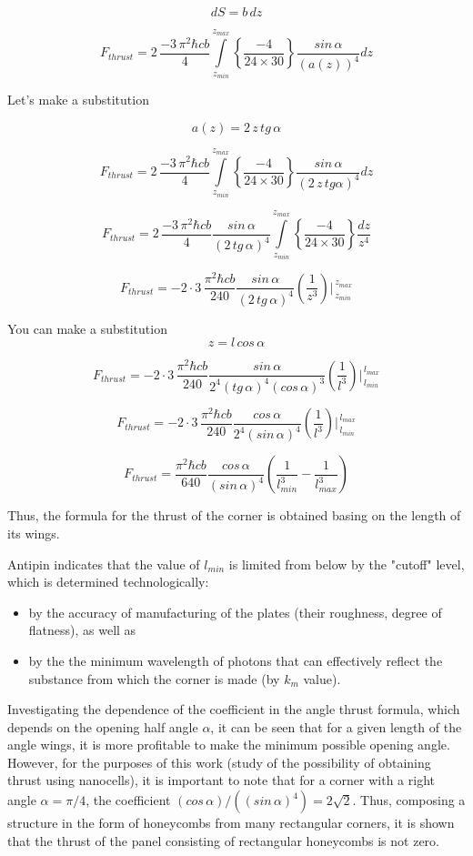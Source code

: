\documentclass[11pt]{article}
\begin{document}
\[dS = b\,dz\]

\[F_{thrust} = 2\, \frac{-3\,\pi^2\hbar c b}{4}\int\limits_{z_{min}}^{z_{max}} \left\{\frac{-4}{24\times30}\right\}\frac{sin\, \alpha}{\left(a\left(z\right)\right)^4}dz\]

Let's make a substitution

\[a\left(z\right) = 2\,z\,tg\, \alpha\]

\[F_{thrust} = 2\, \frac{-3\,\pi^2\hbar c b}{4}\int\limits_{z_{min}}^{z_{max}} \left\{\frac{-4}{24\times30}\right\}\frac{sin\, \alpha}{\left(2\,z\,tg \alpha\right)^4}dz\]

\[F_{thrust} = 2\, \frac{-3\,\pi^2\hbar c b}{4} \frac{sin\, \alpha}{\left(2\,tg\, \alpha\right)^4} \int\limits_{z_{min}}^{z_{max}} \left\{\frac{-4}{24\times30}\right\} \frac{dz}{z^4}\]

\[F_{thrust} = -2\cdot3\, \frac{\pi^2\hbar c b}{240} \frac{sin\, \alpha}{\left(2\,tg\, \alpha\right)^4} \left(\frac{1}{z^3}\right)\Bigg\rvert_{\,z_{min}}^{\,z_{max}} \]

    You can make a substitution \[z = l\, cos\, \alpha\]

\[F_{thrust} = -2\cdot3\, \frac{\pi^2\hbar c b}{240} \frac{sin\, \alpha}{2^4\left(tg\,\alpha\right)^4\left(cos\, \alpha\right)^3} \left(\frac{1}{l^3}\right)\Bigg\rvert_{\,l_{min}}^{\,l_{max}} \]

\[F_{thrust} = -2\cdot3\, \frac{\pi^2\hbar c b}{240} \frac{cos\, \alpha}{2^4\left(sin\, \alpha\right)^4} \left(\frac{1}{l^3}\right)\Bigg\rvert_{\,l_{min}}^{\,l_{max}} \]

\[F_{thrust} = \frac{\pi^2\hbar c b}{640} \frac{cos\, \alpha}{\left(sin\, \alpha\right)^4} \left(\frac{1}{l_{min}^3} - \frac{1}{l_{max}^3}\right)\]

Thus, the formula for the thrust of the corner is obtained basing on the
length of its wings.

Antipin indicates that the value of \(l_{min}\) is limited from below by
the "cutoff" level, which is determined technologically:

\begin{itemize}
\item
  by the accuracy of manufacturing of the plates (their roughness,
  degree of flatness), as well as
\item
  by the the minimum wavelength of photons that can effectively reflect
  the substance from which the corner is made (by \(k_m\) value).
\end{itemize}

    Investigating the dependence of the coefficient in the angle thrust
formula, which depends on the opening half angle \(\alpha\), it can be
seen that for a given length of the angle wings, it is more profitable
to make the minimum possible opening angle. However, for the purposes of
this work (study of the possibility of obtaining thrust using
nanocells), it is important to note that for a corner with a right angle
\(\alpha = {\pi}/{4}\), the coefficient
\(\left({cos\, \alpha}\right)\big/\left({\left(sin\, \alpha\right)^4}\right) = 2\sqrt{2}\).
Thus, composing a structure in the form of honeycombs from many
rectangular corners, it is shown that the thrust of the panel consisting
of rectangular honeycombs is not zero.
\end{document}
